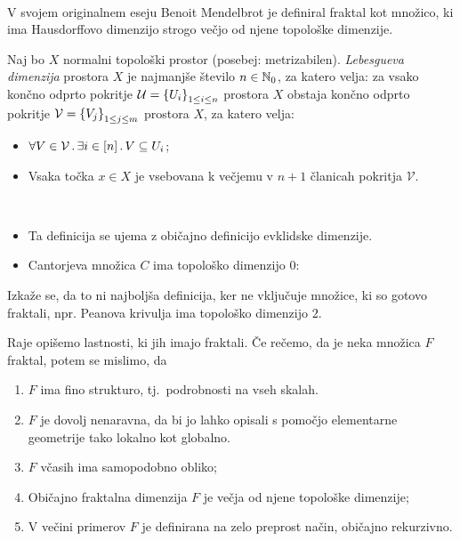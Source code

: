 \ 

V svojem originalnem eseju Benoit Mendelbrot je definiral fraktal kot množico, ki ima Hausdorffovo dimenzijo strogo večjo od njene topološke dimenzije. 
\begin{definicija}
    Naj bo \(X\) normalni topološki prostor (posebej: metrizabilen). \emph{Lebesgueva dimenzija} prostora \(X\) je najmanjše število \(n \in \mathbb{N}_0\), za katero velja: za vsako končno odprto pokritje \(\mathcal{U} = \left\{U_i\right\}_{1 \leq i \leq n}\) prostora \(X\) obstaja končno odprto pokritje \(\mathcal{V} =  \left\{V_j\right\}_{1 \leq j \leq m}\) prostora \(X\), za katero velja:
    \begin{itemize}
        \item \(\forall V \in \mathcal{V} \,.\, \exists i \in [n] \,.\, V \subseteq U_i\);
        \item Vsaka točka \(x \in X\) je vsebovana k večjemu v \(n + 1\) članicah pokritja \(\mathcal{V}\).
    \end{itemize} 
\end{definicija}

\begin{primer} \ 
    \begin{itemize}
        \item Ta definicija se ujema z običajno definicijo evklidske dimenzije.
        \item Cantorjeva množica \(C\) ima topološko dimenzijo \(0\): \todo{}
    \end{itemize}
\end{primer}

Izkaže se, da to ni najboljša definicija, ker ne vključuje množice, ki so gotovo fraktali, npr. Peanova krivulja ima topološko dimenzijo \(2\).

Raje opišemo lastnosti, ki jih imajo fraktali. Če rečemo, da je neka množica \(F\) fraktal, potem se mislimo, da
\begin{enumerate}
    \item \(F\) ima fino strukturo, tj.\ podrobnosti na vseh skalah.
    \item \(F\) je dovolj nenaravna, da bi jo lahko opisali s pomočjo elementarne geometrije tako lokalno kot globalno.
    \item \(F\) včasih ima samopodobno obliko;
    \item Običajno fraktalna dimenzija \(F\) je večja od njene topološke dimenzije;
    \item V večini primerov \(F\) je definirana na zelo preprost način, običajno rekurzivno.
\end{enumerate}

